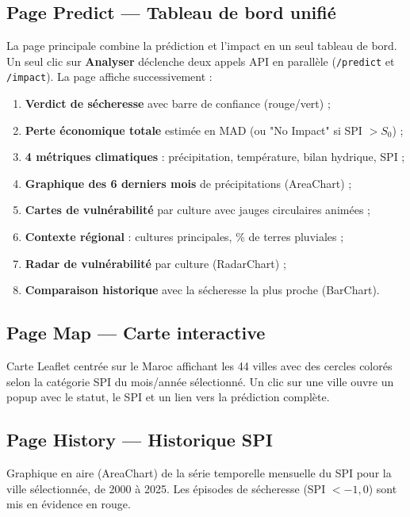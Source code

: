 \documentclass[12pt,a4paper]{report}
\begin{document}
\subsection{Page Predict — Tableau de bord unifié}

La page principale combine la prédiction et l'impact en un seul tableau de bord. Un seul clic sur \textbf{Analyser} déclenche deux appels API en parallèle (\texttt{/predict} et \texttt{/impact}). La page affiche successivement :

\begin{enumerate}
    \item \textbf{Verdict de sécheresse} avec barre de confiance (rouge/vert) ;
    \item \textbf{Perte économique totale} estimée en MAD (ou "No Impact" si SPI $> S_0$) ;
    \item \textbf{4 métriques climatiques} : précipitation, température, bilan hydrique, SPI ;
    \item \textbf{Graphique des 6 derniers mois} de précipitations (AreaChart) ;
    \item \textbf{Cartes de vulnérabilité} par culture avec jauges circulaires animées ;
    \item \textbf{Contexte régional} : cultures principales, \% de terres pluviales ;
    \item \textbf{Radar de vulnérabilité} par culture (RadarChart) ;
    \item \textbf{Comparaison historique} avec la sécheresse la plus proche (BarChart).
\end{enumerate}

\subsection{Page Map — Carte interactive}

Carte Leaflet centrée sur le Maroc affichant les 44 villes avec des cercles colorés selon la catégorie SPI du mois/année sélectionné. Un clic sur une ville ouvre un popup avec le statut, le SPI et un lien vers la prédiction complète.

\subsection{Page History — Historique SPI}

Graphique en aire (AreaChart) de la série temporelle mensuelle du SPI pour la ville sélectionnée, de 2000 à 2025. Les épisodes de sécheresse (SPI $< -1{,}0$) sont mis en évidence en rouge.
\end{document}
